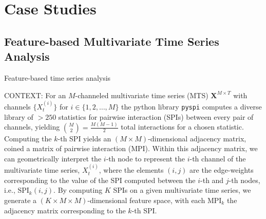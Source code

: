 \begin{abstract}
\end{abstract}

\section{Case Studies}
\label{casestudies}

\subsection{Feature-based Multivariate Time Series Analysis}
Feature-based time series analysis \cite{}

CONTEXT: For an $M$-channeled multivariate time series (MTS) $\mathbf{X}^{M \times T}$ with channels $\{X_t^{(i)}\}$ for $i \in \{1, 2, \dots, M\}$ the python library \texttt{pyspi} computes a diverse library of $>250$ statistics for pairwise interaction (SPIs) between every pair of channels, yielding ${M \choose 2}=\frac{M(M-1)}{2}$ total interactions for a chosen statistic. Computing the $k$-th SPI yields an $(M \times M)$-dimensional adjacency matrix, coined a matrix of pairwise interaction (MPI). Within this adjacency matrix, we can geometrically interpret the $i$-th node to represent the $i$-th channel of the multivariate time series, $X_t^{(i)}$, where the elements $(i,j)$ are the edge-weights corresponding to the value of the SPI computed between the $i$-th and $j$-th nodes, i.e., $\mathrm{SPI}_k(i,j)$. By computing $K$ SPIs on a given multivariate time series, we generate a $(K \times M \times M)$-dimensional feature space, with each $\mathrm{MPI}_k$ the adjacency matrix corresponding to the $k$-th SPI.

